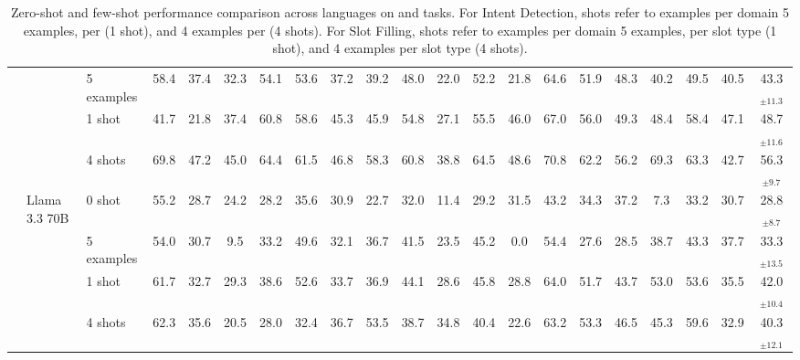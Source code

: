 \begin{table*}[htbp!]
{\begin{tabular}{c|l|l|cccccccccccccccccc}
& & 5 examples & 58.4 & 37.4 & 32.3 & 54.1 & 53.6 & 37.2 & 39.2 & 48.0 & 22.0 & 52.2 & 21.8 & 64.6 & 51.9 & 48.3 & 40.2 & 49.5 & 40.5 & 43.3$_{\pm 11.3}$ \\
& & 1 shot & 41.7 & 21.8 & 37.4 & 60.8 & 58.6 & 45.3 & 45.9 & 54.8 & 27.1 & 55.5 & 46.0 & 67.0 & 56.0 & 49.3 & 48.4 & 58.4 & 47.1 & 48.7$_{\pm 11.6}$ \\
& & 4 shots & 69.8 & 47.2 & 45.0 & 64.4 & 61.5 & 46.8 & 58.3 & 60.8 & 38.8 & 64.5 & 48.6 & 70.8 & 62.2 & 56.2 & 69.3 & 63.3 & 42.7 & 56.3$_{\pm 9.7}$ \\ \cmidrule{2-21}
& \multirow{4}{*}{Llama 3.3 70B} & 0 shot & 55.2 & 28.7 & 24.2 & 28.2 & 35.6 & 30.9 & 22.7 & 32.0 & 11.4 & 29.2 & 31.5 & 43.2 & 34.3 & 37.2 & 7.3 & 33.2 & 30.7 & 28.8$_{\pm 8.7}$ \\
& & 5 examples & 54.0 & 30.7 & 9.5 & 33.2 & 49.6 & 32.1 & 36.7 & 41.5 & 23.5 & 45.2 & 0.0 & 54.4 & 27.6 & 28.5 & 38.7 & 43.3 & 37.7 & 33.3$_{\pm 13.5}$ \\
& & 1 shot & 61.7 & 32.7 & 29.3 & 38.6 & 52.6 & 33.7 & 36.9 & 44.1 & 28.6 & 45.8 & 28.8 & 64.0 & 51.7 & 43.7 & 53.0 & 53.6 & 35.5 & 42.0$_{\pm 10.4}$ \\
& & 4 shots & 62.3 & 35.6 & 20.5 & 28.0 & 32.4 & 36.7 & 53.5 & 38.7 & 34.8 & 40.4 & 22.6 & 63.2 & 53.3 & 46.5 & 45.3 & 59.6 & 32.9 & 40.3$_{\pm 12.1}$ \\
\bottomrule
\end{tabular}
}
\caption{Zero-shot and few-shot performance comparison across languages on and tasks. For Intent Detection, shots refer to examples per domain 5 examples, per (1 shot), and 4 examples per (4 shots). For Slot Filling, shots refer to examples per domain 5 examples, per slot type (1 shot), and 4 examples per slot type (4 shots).}
\label{tab:few-shot-results}
\end{table*}



